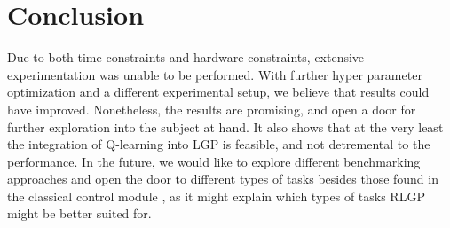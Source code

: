 \documentclass[12pt, final]{dalcsthesis}
\begin{document}
\chapter{Conclusion}

Due to both time constraints and hardware constraints, extensive experimentation was unable to be performed. With further hyper parameter optimization and a different experimental setup, we believe that results could have improved. Nonetheless, the results are promising, and open a door for further exploration into the subject at hand. It also shows that at the very least the integration of Q-learning into LGP is feasible, and not detremental to the performance. In the future, we would like to
explore different benchmarking approaches and open the door to different types of tasks besides those found in the classical control module \cite{1606.01540}, as it might explain which types of tasks RLGP might be better suited for.



\end{document}
